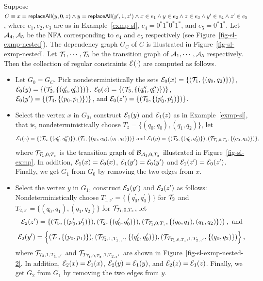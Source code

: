 \begin{example}
Suppose $C \equiv x= \mathsf{replaceAll}(y, 0, z) \wedge y = \mathsf{replaceAll}(y', 1, z') \wedge x \in e_1 \wedge y \in e_2 \wedge z \in e_3 \wedge y' \in e_4  \wedge z' \in e_5$, where $e_1, e_2, e_3$ are as in Example~\ref{exmp-sl}, $e_4=0^* 1^* 0^* 1^*$, and $e_5=0^*1^*$. Let $\mathcal{A}_4,\mathcal{A}_5$ be the NFA corresponding to $e_4$ and $e_5$ respectively (see Figure~\ref{fig-sl-exmp-nested}). The dependency graph $G_C$ of $C$ is illustrated in Figure~\ref{fig-sl-exmp-nested}. Let $\mathcal{T}_1,\cdots, \mathcal{T}_5$ be the transition graph of $\mathcal{A}_1,\cdots, \mathcal{A}_5$ respectively. Then the collection of regular constraints $\mathcal{E}(\cdot)$ are computed as follows.
\begin{itemize}
\item Let $G_0=G_C$. Pick nondeterministically the sets $\mathcal{E}_0(x) = \{(\mathcal{T}_1, \{(q_0, q_2)\})\}$, $\mathcal{E}_0(y) = \{(\mathcal{T}_2, \{(q^\prime_0, q^\prime_0)\})\}$, $\mathcal{E}_0(z) = \{(\mathcal{T}_3, \{(q^{\prime\prime}_0, q^{\prime\prime}_0)\})\}$, $\mathcal{E}_0(y^\prime) = \{(\mathcal{T}_4, \{(p_0, p_1)\})\}$, and $\mathcal{E}_0(z^\prime) = \{(\mathcal{T}_5, \{(p^{\prime}_0, p^{\prime}_1)\})\}$.
%
\item Select the vertex $x$ in $G_0$, construct $\mathcal{E}_1(y)$ and $\mathcal{E}_1(z)$ as in Example~\ref{exmp-sl}, that is, nondeterministically choose $T_z =\{(q_0, q_0), (q_1,q_2)\}$, let 
$$\mathcal{E}_1(z) = \{(\mathcal{T}_3, \{(q^{\prime\prime}_0, q^{\prime\prime}_0)\}), (\mathcal{T}_1, \{(q_0,q_0), (q_1, q_2)\})\} \mbox{ and } \mathcal{E}_1(y)=\{(\mathcal{T}_2, \{(q^\prime_0, q^\prime_0)\}), (\mathcal{T}_{\mathcal{T}_1, 0, T_z}, \{(q_0,q_2)\})\},$$ 
where $\mathcal{T}_{\mathcal{T}_1, 0, T_z}$ 
is the transition graph of $\mathcal{B}_{\mathcal{A}_1, 0, T_z}$ illustrated in Figure~\ref{fig-sl-exmp}. In addition, $\mathcal{E}_1(x)=\mathcal{E}_0(x)$, $\mathcal{E}_1(y')=\mathcal{E}_0(y')$ and $\mathcal{E}_1(z')=\mathcal{E}_0(z')$. Finally, we get $G_1$ from $G_0$ by removing the two edges from $x$.
%
\item Select the vertex $y$ in $G_1$, construct $\mathcal{E}_2(y')$ and $\mathcal{E}_2(z')$ as follows: Nondeterministically choose $T_{1,z'} = \{(q^\prime_0, q^\prime_0)\}$  for $\mathcal{T}_2$ and $T_{2,z'}=\{(q_0,q_1),(q_1,q_2)\}$ for $\mathcal{T}_{\mathcal{T}_1, 0, T_z}$, let
$$\mathcal{E}_2(z')=\left\{(\mathcal{T}_5, \{(p^{\prime}_0, p^{\prime}_1)\}), (\mathcal{T}_2, \{(q^\prime_0, q^\prime_0)\}), (\mathcal{T}_{\mathcal{T}_1, 0, T_z}, \{(q_0,q_1),(q_1,q_2)\}) \right\}, \text{ and}$$
$$\mathcal{E}_2(y')=\left\{ (\mathcal{T}_4, \{(p_0, p_1)\}), (\mathcal{T}_{\mathcal{T}_2, 1, T_{1,z'}}, \{(q^\prime_0, q^\prime_0)\}), (\mathcal{T}_{\mathcal{T}_{\mathcal{T}_1, 0, T_z}, 1, T_{2,z'}}, \{(q_0,q_2)\}) \right\},$$
where $\mathcal{T}_{\mathcal{T}_2, 1, T_{1,z'}}$ and $\mathcal{T}_{\mathcal{T}_{\mathcal{T}_1, 0, T_z}, 1, T_{2,z'}}$ are shown in Figure~\ref{fig-sl-exmp-nested-2}. In addition, $\mathcal{E}_2(x)=\mathcal{E}_1(x)$, $\mathcal{E}_2(y)=\mathcal{E}_1(y)$, and $\mathcal{E}_2(z)=\mathcal{E}_1(z)$. Finally, we get $G_2$ from $G_1$ by removing the two edges from $y$.

\end{itemize}
\end{example}
